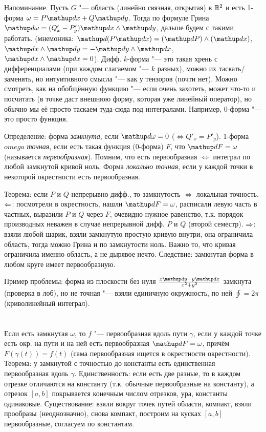 \section{} %
	Напоминание.
	Пусть $G$ "--- область (линейно связная, открытая) в $\mathbb{R}^2$ и есть 1-форма $\omega = P\d x + Q\d y$.
	Тогда по формуле Грина $\d \omega = (Q'_x - P'_y)\d x \wedge \d y$, дальше будем с такими работать.
	(мнемоника: $\d (P \d x) = (\d P) \wedge (\d x)$, $\d x \wedge \d y = -\d y \wedge \d x$, $\d x \wedge \d x = 0$).
	Дифф. $k$-форма "--- это такая хрень с дифференциалами (при каждом слагаемом "--- $k$ разных), можно их таскать/заменять, но интуитивного смысла "--- как у тензоров (почти нет).
	Можно смотреть, как на обобщённую функцию "--- если очень захотеть, может что-то и посчитать (в точке даст внешнюю форму, которая уже линейный оператор),
	но обычно мы её просто таскаем туда-сюда под интегралами.
	Например, $0$-форма "--- это просто функция.

	Определение: форма \textit{замкнута}, если $\d \omega=0$ ($\iff Q'_x=P'_y$).
	1-форма $omega$ \textit{точная}, если есть такая функция (0-форма) $F$, что $\d F = \omega$
	(называется \textit{первообразная}).
	Помним, что есть первообразная $\iff$ интеграл по любой замкнутой кривой ноль.
	Форма \textit{локально точная}, если у каждой точки в некоторой окрестности есть первообразная.

	Теорема: если $P$ и $Q$ непрерывно дифф., то замкнутость $\iff$ локальная точность.
	$\Leftarrow$: посмотрели в окрестность, нашли $\d F = \omega$, расписали левую часть в частных,
	выразили $P$ и $Q$ через $F$, очевидно нужное равенство, т.к. порядок производных неважен в случае непрерывной дифф. $P$ и $Q$ (второй семестр).
	$\Rightarrow$: взяли любой шарик, взяли замкнутую простую кривую внутри, она ограничила область, тогда можно Грина и по замкнутости ноль.
	Важно то, что кривая ограничила именно область, а не дырявое нечто.
	Следствие: замкнутая форма в любом круге имеет первообразную.

	Пример проблемы: форма из плоскости без нуля $\frac{x \d y - y \d x}{x^2+y^2}$ замкнута (проверка в лоб),
	но не точная "--- взяли единичную окружность, по ней $\oint=2\pi$ (криволинейный интеграл).

\section{} %
	Если есть замкнутая $\omega$, то $f$ "--- первообразная вдоль пути $\gamma$, если
	у каждой точке есть окр. на пути и на ней есть первообразная $\d F = \omega$, причём $F(\gamma(t))=f(t)$
	(сама первообразная ищется в окрестности окрестности).
	Теорема: у замкнутой с точностью до константы есть единственная первообразная вдоль $\gamma$.
	Единственность: если есть две разные, то в каждом отрезке отличаются на константу (т.к. обычные
	первообразные на константу), а отрезок $[a,b]$ покрывается конечным числом отрезков, ура, константы одинаковые.
	Существование: взяли вокруг точек путей области, компакт, взяли прообразы (неоднозначно), снова компакт, построим на кусках $[a,b]$ первообразные, согласуем по константам.


